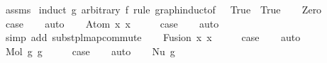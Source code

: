 \begin{isabellebody}
%
\isadelimproof
%
\endisadelimproof
%
\isatagproof
{}\isamarkupfalse%
\ assms\isanewline
{}\isamarkupfalse%
\ {\isacharparenleft}{\kern0pt}induct\ g{}\ arbitrary{\isacharcolon}{\kern0pt}\ f\ rule{\isacharcolon}{\kern0pt}\ graph{\isachardot}{\kern0pt}induct{\isacharbrackleft}{\kern0pt}of\ {\isacharunderscore}{\kern0pt}\ {\isachardoublequoteopen}{\isacharpercent}{\kern0pt}{\isacharunderscore}{\kern0pt}{\isachardot}{\kern0pt}\ True{\isachardoublequoteclose}\ {\isachardoublequoteopen}{\isacharpercent}{\kern0pt}{\isacharunderscore}{\kern0pt}{\isachardot}{\kern0pt}\ True{\isachardoublequoteclose}{\isacharbrackright}{\kern0pt}{\isacharparenright}{\kern0pt}\isanewline
\ \ \isamarkupfalse%
\ Zero\isanewline
\ \ \isamarkupfalse%
\ \isamarkupfalse%
\ {\isacharquery}{\kern0pt}case\isanewline
\ \ \isamarkupfalse%
\ auto\isanewline
{}\isamarkupfalse%
\isanewline
\ \ \isamarkupfalse%
\ {\isacharparenleft}{\kern0pt}Atom\ x{}\ x{}{\isacharparenright}{\kern0pt}\isanewline
\ \ \isamarkupfalse%
\ \isamarkupfalse%
\ {\isacharquery}{\kern0pt}case\isanewline
\ \ \isamarkupfalse%
\ auto\isanewline
\ \ \isamarkupfalse%
\ {\isacharparenleft}{\kern0pt}simp\ add{\isacharcolon}{\kern0pt}\ subst{\isacharunderscore}{\kern0pt}p{\isacharunderscore}{\kern0pt}lmap{\isacharunderscore}{\kern0pt}commute{\isacharparenright}{\kern0pt}\isanewline
{}\isamarkupfalse%
\isanewline
\ \ \isamarkupfalse%
\ {\isacharparenleft}{\kern0pt}Fusion\ x{}\ x{}{\isacharparenright}{\kern0pt}\isanewline
\ \ \isamarkupfalse%
\ \isamarkupfalse%
\ {\isacharquery}{\kern0pt}case\isanewline
\ \ \isamarkupfalse%
\ auto\isanewline
{}\isamarkupfalse%
\isanewline
\ \ \isamarkupfalse%
\ {\isacharparenleft}{\kern0pt}Mol\ g{}{}\ g{}{}{\isacharparenright}{\kern0pt}\isanewline
\ \ \isamarkupfalse%
\ \isamarkupfalse%
\ {\isacharquery}{\kern0pt}case\isanewline
\ \ \isamarkupfalse%
\ auto\isanewline
{}\isamarkupfalse%
\isanewline
\ \ \isamarkupfalse%
\ {\isacharparenleft}{\kern0pt}Nu\ g{}{\isacharparenright}{\kern0pt}\isanewline
\ \ \isamarkupfalse%

\end{isabellebody}
